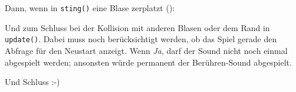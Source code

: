 
Dann, wenn in \texttt{sting()} eine Blase zerplatzt ():


Und zum Schluss bei der Kollision mit anderen Blasen oder dem Rand in \texttt{update()}. Dabei muss noch berücksichtigt werden, ob das Spiel gerade den Abfrage für den Neustart anzeigt. Wenn \emph{Ja}, darf der Sound nicht noch einmal abgespielt werden; ansonsten würde permanent der Berühren-Sound abgespielt. 


Und Schluss :-)

